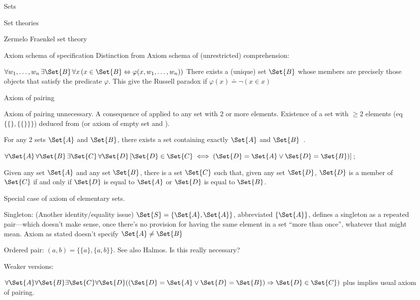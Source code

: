 \begin{plSection}{Sets}
\begin{plSection}{Set theories}
\begin{plSection}{Zermelo Fraenkel set theory}
\begin{plSection}{Axiom schema of specification}
Distinction from Axiom schema of (unrestricted) comprehension:

$\forall w_1,\ldots,w_n \, \exists \Set{B} \, 
\forall x \, ( x \in \Set{B} 
\Leftrightarrow \varphi(x, w_1, \ldots, w_n) )$
There exists a (unique) set $\Set{B}$ 
whose members are precisely those objects 
that satisfy the predicate $\varphi$.
This give the Russell paradox if 
$\varphi(x) \doteq \neg(x \in x)$

\end{plSection}%
\begin{plSection}{Axiom of pairing}
\label{sec:Axiom-of-pairing}

Axiom of pairing unnecessary.
A consequence of 
applied to any set with $2$ or more elements.
Existence of a set with $\geq 2$ elements
(eq $\{ \{\}, \{ \{\} \} \}$)
deduced from 
(or axiom of empty set\cite{wiki:AxiomOfEmptySet}
and ).

For any $2$ sets $\Set{A}$ and $\Set{B}$,
there exists a set containing exactly $\Set{A}$ and 
$\Set{B}$~\cite{wiki:AxiomOfPairing}.

$\forall \Set{A}\,\forall \Set{B}\,\exists \Set{C}\,\forall \Set{D}\,
[\Set{D}\in \Set{C}\iff (\Set{D}=\Set{A}\lor \Set{D}=\Set{B})]$;

Given any set $\Set{A}$ and any set $\Set{B}$, 
there is a set $\Set{C}$ such that, 
given any set $\Set{D}$, 
$\Set{D}$ is a member of $\Set{C}$ 
if and only if 
$\Set{D}$ is equal to $\Set{A}$ 
or 
$\Set{D}$ is equal to $\Set{B}$.

Special case of axiom of elementary 
sets\cite{wiki:ZermeloSetTheory}.

Singleton:
(Another identity/equality issue)
$\Set{S}=\{\Set{A},\Set{A}\}$, abbreviated $\{\Set{A}\}$,
defines a singleton as a repeated pair---which doesn't make sense,
once there's no provision for having the same element
in a set ``more than once'', whatever that might mean.
Axiom as stated doesn't specify $\Set{A} \neq \Set{B}$

Ordered pair:
$(a,b)=\{\{a\},\{a,b\}\}$.
See also Halmos\cite{Halmos:1960:NaiveSetTheory}.
Is this really necessary? 

Weaker versions:
 
${\displaystyle 
\forall \Set{A} \forall \Set{B} 
\exists \Set{C}
\forall \Set{D}((\Set{D}=\Set{A}\lor \Set{D}=\Set{B}) \Rightarrow \Set{D}\in \Set{C})}$
plus 
implies usual axiom of pairing.


\end{plSection}
\end{plSection}
\end{plSection}
\end{plSection}
